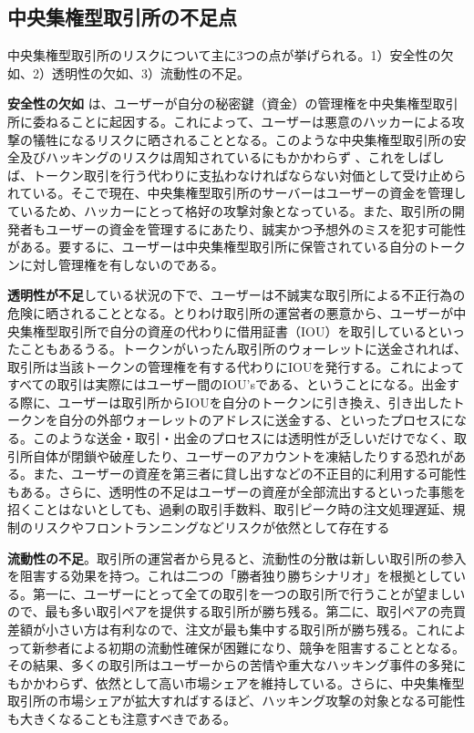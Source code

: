 \documentclass{article}
\begin{document}
\begin{multicols}{2}
\subsection{中央集権型取引所の不足点}
中央集権型取引所のリスクについて主に3つの点が挙げられる。1）安全性の欠如、2）透明性の欠如、3）流動性の不足。

\textbf{安全性の欠如} は、ユーザーが自分の秘密鍵（資金）の管理権を中央集権型取引所に委ねることに起因する。これによって、ユーザーは悪意のハッカーによる攻撃の犠牲になるリスクに晒されることとなる。このような中央集権型取引所の安全及びハッキングのリスクは周知されているにもかかわらず \cite{coincheckhack}  \cite{mcmillan2014inside} 、これをしばしば、トークン取引を行う代わりに支払わなければならない対価として受け止められている。そこで現在、中央集権型取引所のサーバーはユーザーの資金を管理しているため、ハッカーにとって格好の攻撃対象となっている。また、取引所の開発者もユーザーの資金を管理するにあたり、誠実かつ予想外のミスを犯す可能性がある。要するに、ユーザーは中央集権型取引所に保管されている自分のトークンに対し管理権を有しないのである。

\textbf{透明性が不足}している状況の下で、ユーザーは不誠実な取引所による不正行為の危険に晒されることとなる。とりわけ取引所の運営者の悪意から、ユーザーが中央集権型取引所で自分の資産の代わりに借用証書（IOU）を取引しているといったこともあるうる。トークンがいったん取引所のウォーレットに送金されれば、取引所は当該トークンの管理権を有する代わりにIOUを発行する。これによってすべての取引は実際にはユーザー間のIOU’sである、ということになる。出金する際に、ユーザーは取引所からIOUを自分のトークンに引き換え、引き出したトークンを自分の外部ウォーレットのアドレスに送金する、といったプロセスになる。このような送金・取引・出金のプロセスには透明性が乏しいだけでなく、取引所自体が閉鎖や破産したり、ユーザーのアカウントを凍結したりする恐れがある。また、ユーザーの資産を第三者に貸し出すなどの不正目的に利用する可能性もある。さらに、透明性の不足はユーザーの資産が全部流出するといった事態を招くことはないとしても、過剰の取引手数料、取引ピーク時の注文処理遅延、規制のリスクやフロントランニングなどリスクが依然として存在する

\textbf{流動性の不足}。取引所の運営者から見ると、流動性の分散は新しい取引所の参入を阻害する効果を持つ。これは二つの「勝者独り勝ちシナリオ」を根拠としている。第一に、ユーザーにとって全ての取引を一つの取引所で行うことが望ましいので、最も多い取引ペアを提供する取引所が勝ち残る。第二に、取引ペアの売買差額が小さい方は有利なので、注文が最も集中する取引所が勝ち残る。これによって新参者による初期の流動性確保が困難になり、競争を阻害することとなる。その結果、多くの取引所はユーザーからの苦情や重大なハッキング事件の多発にもかかわらず、依然として高い市場シェアを維持している。さらに、中央集権型取引所の市場シェアが拡大すればするほど、ハッキング攻撃の対象となる可能性も大きくなることも注意すべきである。 


\end{multicols}
\end{document}
